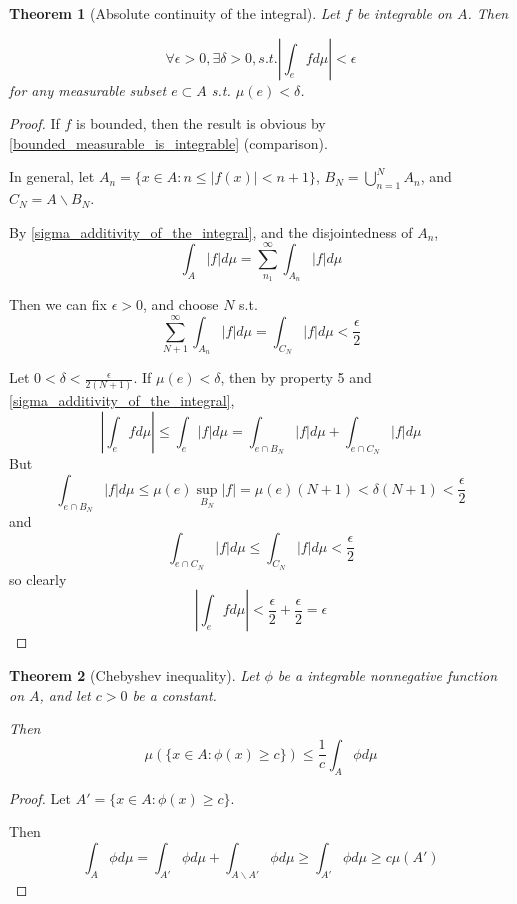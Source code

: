 \documentclass[11pt,a4paper]{report}
\theoremstyle{plain}
\newtheorem{thm}{Theorem}[section]
\theoremstyle{definition}
\theoremstyle{remark}
\newcommand{\intersection}{\cap}
\newcommand{\Union}{\bigcup}
\newcommand{\abs}[1]{\left| #1 \right|}
\begin{document}
\begin{thm}[Absolute continuity of the integral]
    Let $f$ be integrable on $A$. Then

    $$ \forall \epsilon > 0, \exists \delta > 0, s.t. \abs{\int_e f d\mu} < \epsilon $$
    for any measurable subset $e \subset A$ s.t. $\mu(e) < \delta$.
\end{thm}

\begin{proof}
    If $f$ is bounded, then the result is obvious by \ref{bounded_measurable_is_integrable} (comparison). %

    In general, let $A_n = \{ x \in A : n \le \abs{f(x)} < n + 1 \}$, $B_N = \Union_{n=1}^N A_n$, and $C_N = A \backslash B_N$.

    By \ref{sigma_additivity_of_the_integral}, and the disjointedness of $A_n$,
    $$ \int_A \abs{f} d\mu = \sum_{n_1}^\infty \int_{A_n} \abs{f} d\mu $$

    Then we can fix $\epsilon > 0$, and choose $N$ s.t.
    $$ \sum_{N+1}^\infty \int_{A_n} \abs{f} d\mu = \int_{C_N} \abs{f} d\mu < \frac{\epsilon}{2} $$

    Let $ 0 < \delta < \frac{\epsilon}{2(N+1)}$. If $\mu(e) < \delta$, then by property 5 and \ref{sigma_additivity_of_the_integral},
    $$ \abs{\int_e f d\mu} \le \int_e \abs{f} d\mu = \int_{e \intersection B_N} \abs{f} d\mu + \int_{e \intersection C_N} \abs{f} d\mu $$
    But
    $$ \int_{e \intersection B_N} \abs{f} d\mu \le \mu(e) \sup_{B_N} \abs{f} = \mu(e)(N + 1) < \delta(N+1) < \frac{\epsilon}{2} $$
    and
    $$ \int_{e \intersection C_N} \abs{f} d\mu \le \int_{C_N} \abs{f} d\mu < \frac{\epsilon}{2} $$
    so clearly
    $$\abs{\int_e f d\mu} < \frac{\epsilon}{2} + \frac{\epsilon}{2} = \epsilon $$
\end{proof}

\begin{thm}[Chebyshev inequality]
    Let $\phi$ be a integrable nonnegative function on $A$, and let $c > 0$ be a constant.

    Then
    $$ \mu(\{ x \in A : \phi(x) \ge c \}) \le \frac{1}{c} \int_A \phi d\mu $$
\end{thm}

\begin{proof}
    Let $A' = \{x \in A : \phi(x) \ge c \}$.

    Then 
    $$ \int_A \phi d\mu = \int_{A'} \phi d\mu + \int_{A \backslash A'} \phi d\mu \ge \int_{A'} \phi d\mu \ge c\mu(A') $$
\end{proof}
\end{document}
